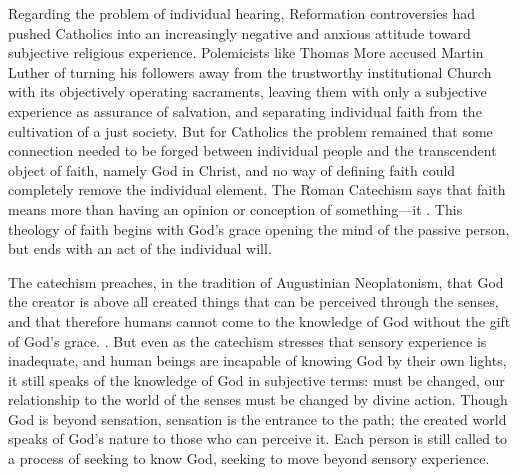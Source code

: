 Regarding the problem of individual hearing, Reformation controversies had 
pushed Catholics into an increasingly negative and anxious attitude toward 
subjective religious experience.
Polemicists like Thomas More accused Martin Luther of turning his followers 
away from the trustworthy institutional Church with its objectively operating 
sacraments, leaving them with only a subjective experience as assurance of 
salvation, and separating individual faith from the cultivation of a just 
society.%
    \Autocite[ch.~4]{Schreiner:Certainty}
But for Catholics the problem remained that some connection needed to be forged 
between individual people and the transcendent object of faith, namely God in 
Christ, and no way of defining faith could completely remove the individual 
element.
The Roman Catechism says that faith means more than having an opinion or 
conception of something---it .%
    \Autocite
    [15: .]
    {Catholic:Catechismus1614}
This theology of faith begins with God's grace opening the mind of the passive 
person, but ends with an act of the individual will.

The catechism preaches, in the tradition of Augustinian Neoplatonism, that God 
the creator is above all created things that can be perceived through the 
senses, and that therefore humans cannot come to the knowledge of God without 
the gift of God's grace.
.%
    \Autocite
    [18: .]
    {Catholic:Catechismus1614}
But even as the catechism stresses that sensory experience is inadequate, and 
human beings are incapable of knowing God by their own lights, it still speaks 
of the knowledge of God in subjective terms:  must be 
changed, our relationship to the world of the senses must be changed by divine 
action.
Though God is beyond sensation, sensation is the entrance to the path; the 
created world speaks of God's nature to those who can perceive it.
Each person is still called to a process of seeking to know God, seeking to 
move beyond sensory experience.

